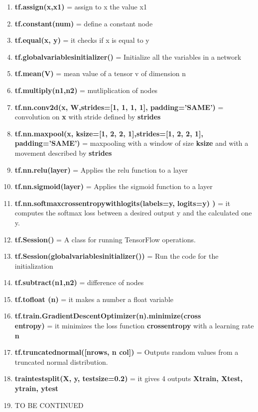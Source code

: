 \documentclass[11pt]{article}
\begin{document}
\begin{multicols}{2}
\begin{enumerate}
\item \textbf{tf.assign(x,x1)} = assign to x the value x1
\item \textbf{tf.constant(num)} = define a constant node
\item \textbf{tf.equal(x, y)} = it checks if x is equal to y
\item \textbf{tf.global\textunderscore variables\textunderscore initializer()} = Initialize all the variables in a network
\item \textbf{tf.mean(V)} = mean value of a tensor v of dimension n
\item \textbf{tf.multiply(n1,n2)} = mutliplication of nodes
\item \textbf{tf.nn.conv2d(x, W,strides=[1, 1, 1, 1], padding='SAME')} = convolution on \textbf{x} with stride defined by \textbf{strides}
\item \textbf{tf.nn.max\textunderscore pool(x, ksize=[1, 2, 2, 1],strides=[1, 2, 2, 1], padding='SAME')} = max\textunderscore pooling with a window of size \textbf{ksize} and with a movement described by  \textbf{strides} 
\item \textbf{tf.nn.relu(layer)} = Applies the relu function to a layer
\item \textbf{tf.nn.sigmoid(layer)} = Applies the sigmoid function to a layer
\item \textbf{tf.nn.softmax\textunderscore cross\textunderscore entropy\textunderscore with\textunderscore logits(labels=y, logits=y\textunderscore)
)} = it computes the softmax loss between a desired output y and the calculated one y\textunderscore.
\item \textbf{tf.Session()} = A class for running TensorFlow operations.
\item \textbf{tf.Session(global\textunderscore variables\textunderscore initializer())} = Run the code for the initialization
\item \textbf{tf.subtract(n1,n2)} = difference  of nodes
\item \textbf{tf.to\textunderscore float (n)} = it makes a number a float variable
\item \textbf{tf.train.GradientDescentOptimizer(n).minimize(cross\\ \textunderscore entropy)} = it minimizes the loss function \textbf{cross\textunderscore entropy} with a learning rate \textbf{n}
\item  \textbf{tf.truncated\textunderscore normal([n\textunderscore rows, n \textunderscore col])} = Outputs random values from a truncated normal distribution.
\item \textbf{train\textunderscore test\textunderscore split(X, y, test\textunderscore size=0.2)} =  it gives 4 outputs \textbf{X\textunderscore train, X\textunderscore test, y\textunderscore train, y\textunderscore test}
\item TO BE CONTINUED
\end{enumerate}{}
\end{multicols}
\clearpage
\end{document}
